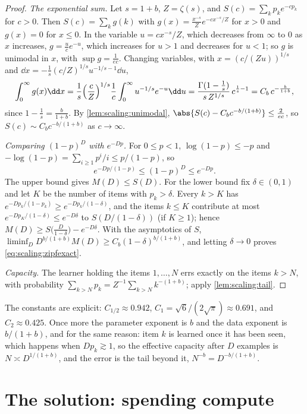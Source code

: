 \begin{refsection}
\begin{proof}
\emph{The exponential sum.} Let $s=1+b$, $Z=\zeta(s)$, and $S(c)=\sum_kp_ke^{-cp_k}$ for $c>0$. Then $S(c)=\sum_kg(k)$ with $g(x)=\frac{x^{-s}}Ze^{-cx^{-s}/Z}$ for $x>0$ and $g(x)=0$ for $x\le0$. In the variable $u=cx^{-s}/Z$, which decreases from $\infty$ to $0$ as $x$ increases, $g=\frac uce^{-u}$, which increases for $u>1$ and decreases for $u<1$; so $g$ is unimodal in $x$, with $\sup g=\frac1{ec}$. Changing variables, with $x=(c/(Zu))^{1/s}$ and $\dd x=-\frac1s(c/Z)^{1/s}u^{-1/s-1}\dd u$,
\[
  \int_0^\infty g(x)\dd x=\frac1s\Bigl(\frac cZ\Bigr)^{1/s}\frac1c\int_0^\infty u^{-1/s}e^{-u}\dd u=\frac{\Gamma(1-\frac1s)}{s\,Z^{1/s}}\,c^{\frac1s-1}=C_b\,c^{-\frac b{1+b}},
\]
since $1-\frac1s=\frac b{1+b}$. By \cref{lem:scaling:unimodal}, $\abs{S(c)-C_bc^{-b/(1+b)}}\le\frac2{ec}$, so $S(c)\sim C_bc^{-b/(1+b)}$ as $c\to\infty$.

\emph{Comparing $(1-p)^D$ with $e^{-Dp}$.} For $0\le p<1$, $\log(1-p)\le-p$ and $-\log(1-p)=\sum_{i\ge1}p^i/i\le p/(1-p)$, so
\[
  e^{-Dp/(1-p)}\le(1-p)^D\le e^{-Dp} .
\]
The upper bound gives $M(D)\le S(D)$. For the lower bound fix $\delta\in(0,1)$ and let $K$ be the number of items with $p_k>\delta$. Every $k>K$ has $e^{-Dp_k/(1-p_k)}\ge e^{-Dp_k/(1-\delta)}$, and the items $k\le K$ contribute at most $e^{-Dp_K/(1-\delta)}\le e^{-D\delta}$ to $S(D/(1-\delta))$ (if $K\ge1$); hence $M(D)\ge S\bigl(\frac D{1-\delta}\bigr)-e^{-D\delta}$. With the asymptotics of $S$, $\liminf_DD^{b/(1+b)}M(D)\ge C_b(1-\delta)^{b/(1+b)}$, and letting $\delta\to0$ proves \eqref{eq:scaling:zipfexact}.

\emph{Capacity.} The learner holding the items $1,\dots,N$ errs exactly on the items $k>N$, with probability $\sum_{k>N}p_k=Z^{-1}\sum_{k>N}k^{-(1+b)}$; apply \cref{lem:scaling:tail}.
\end{proof}

The constants are explicit: $C_{1/2}\approx0.942$, $C_1=\sqrt6/(2\sqrt\pi)\approx0.691$, and $C_2\approx0.425$. Once more the parameter exponent is $b$ and the data exponent is $b/(1+b)$, and for the same reason: item $k$ is learned once it has been seen, which happens when $Dp_k\gtrsim1$, so the effective capacity after $D$ examples is $N\asymp D^{1/(1+b)}$, and the error is the tail beyond it, $N^{-b}=D^{-b/(1+b)}$.

\section{The solution: spending compute}\label{sec:scaling:compute}


\end{refsection}
